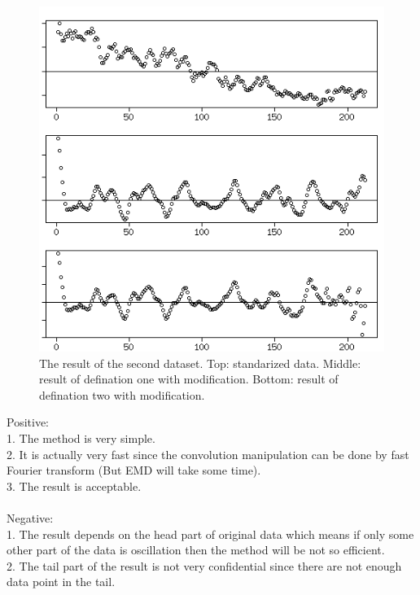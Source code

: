 \documentclass[12pt]{article}
\begin{document}
\begin{figure}[h]
\caption{The result of the second dataset. Top: standarized data. Middle: result of defination one with modification. Bottom: result of defination two with modification.}
\label{fig:second}
\centering
\includegraphics{002}
\end{figure}

Positive: \\

1. The method is very simple. \\

2. It is actually very fast since the convolution manipulation can be done by fast Fourier transform (But EMD will take some time). \\

3. The result is acceptable. \\ \\

Negative: \\

1. The result depends on the head part of original data which means if only some other part of the data is oscillation then the method will be not so efficient. \\

2. The tail part of the result is not very confidential since there are not enough data point in the tail. \\
\end{document}

